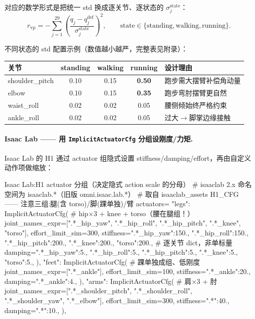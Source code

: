 对应的数学形式是把统一 std 换成逐关节、逐状态的 $\sigma_j^{\mathrm{state}}$：
\begin{equation}
r_{\mathrm{vp}} = -\sum_{j=1}^{29}\left(\frac{q_j-q_j^{\mathrm{def}}}{\sigma_j^{\mathrm{state}}}\right)^2,
\qquad \mathrm{state}\in\{\text{standing},\text{walking},\text{running}\}.
\label{eq:rlmc-hl-vp}
\end{equation}

不同状态的 std 配置示例（数值越小越严，完整表见附录）：

\begin{center}
\small
\begin{tabular}{lccc l}
\hline
关节 & standing & walking & running & 设计理由 \\
\hline
shoulder\_pitch & 0.10 & 0.15 & \textbf{0.50} & 跑步需大摆臂补偿角动量 \\
elbow & 0.10 & 0.15 & \textbf{0.35} & 跑步弯肘摆臂更自然 \\
waist\_roll & 0.02 & 0.02 & 0.05 & 腰侧倾始终严格约束 \\
ankle\_roll & 0.02 & 0.02 & 0.05 & 过大$\to$脚掌边缘接触 \\
\hline
\end{tabular}
\end{center}

\paragraph{Isaac Lab —— 用 \texttt{ImplicitActuatorCfg} 分组设刚度/力矩.}
Isaac Lab 的 H1 通过 actuator 组隐式设置 stiffness/damping/effort，再由自定义动作项做缩放：

\begin{codebox}[Python]{Isaac Lab:H1 actuator 分组（决定隐式 action scale 的分母）}
# isaaclab 2.x 命名空间为 isaaclab.*（旧版 omni.isaac.lab.*）
# 取自 isaaclab_assets H1_CFG —— 注意三组:腿(含 torso)/脚(踝单独)/臂
actuators={
    "legs": ImplicitActuatorCfg(                            # hip×3 + knee + torso（腰在腿组！）
        joint_names_expr=[".*_hip_yaw", ".*_hip_roll", ".*_hip_pitch", ".*_knee", "torso"],
        effort_limit_sim=300,
        stiffness={".*_hip_yaw":150., ".*_hip_roll":150., ".*_hip_pitch":200.,
                   ".*_knee":200., "torso":200.},           # 逐关节 dict，非单标量
        damping={".*_hip_yaw":5., ".*_hip_roll":5., ".*_hip_pitch":5.,
                 ".*_knee":5., "torso":5.},
    ),
    "feet": ImplicitActuatorCfg(                            # 踝单独成组、低刚度
        joint_names_expr=[".*_ankle"],
        effort_limit_sim=100, stiffness={".*_ankle":20.}, damping={".*_ankle":4.},
    ),
    "arms": ImplicitActuatorCfg(                            # 肩×3 + 肘
        joint_names_expr=[".*_shoulder_pitch", ".*_shoulder_roll", ".*_shoulder_yaw", ".*_elbow"],
        effort_limit_sim=300, stiffness={".*":40.}, damping={".*":10.},
    ),
}
\end{codebox}

